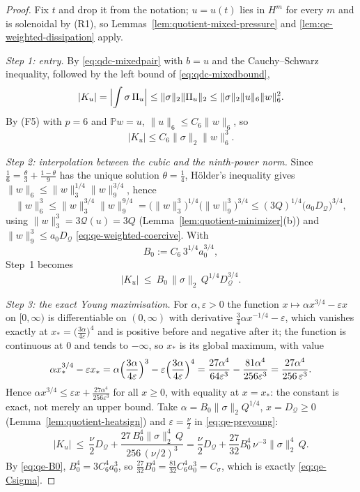 \documentclass[11pt]{article}
\theoremstyle{definition}
\theoremstyle{plain}
\newcommand{\norm}[1]{\lVert #1\rVert}
\begin{document}
\begin{proof}
Fix $t$ and drop it from the notation; $u=u(t)$ lies in $H^m$ for every
$m$ and is solenoidal by (R1), so
Lemmas~\ref{lem:quotient-mixed-pressure} and
\ref{lem:qe-weighted-dissipation} apply.

\emph{Step 1: entry.}  By \eqref{eq:qdc-mixedpair} with $b=u$ and the
Cauchy--Schwarz inequality, followed by the left bound of
\eqref{eq:qdc-mixedbound},
\[
 |K_u|=\Bigl|\int\sigma\,\Pi_u\Bigr|
 \le\norm\sigma_2\norm{\Pi_u}_2
 \le\norm\sigma_2\norm u_6\norm w_6^2 .
\]
By \textup{(F5)} with $p=6$ and $\mathbb Pw=u$,
$\norm u_6\le C_6\norm w_6$, so
\begin{equation}\label{eq:qe-entry}
 |K_u|\le C_6\norm\sigma_2\norm w_6^3 .
\end{equation}

\emph{Step 2: interpolation between the cubic and the ninth-power norm.}
Since $\frac16=\frac{\theta}3+\frac{1-\theta}9$ has the unique solution
$\theta=\frac14$, H\"older's inequality gives
$\norm w_6\le\norm w_3^{1/4}\norm w_9^{3/4}$, hence
\[
 \norm w_6^3\le\norm w_3^{3/4}\norm w_9^{9/4}
 =\bigl(\norm w_3^3\bigr)^{1/4}\bigl(\norm w_9^3\bigr)^{3/4}
 \le(3Q)^{1/4}\bigl(a_0D_{\mathcal Q}\bigr)^{3/4},
\]
using $\norm w_3^3=3\mathcal Q(u)=3Q$ (Lemma~\ref{lem:quotient-minimizer}(b))
and $\norm w_9^3\le a_0D_{\mathcal Q}$
\eqref{eq:qe-weighted-coercive}.  With
\begin{equation}\label{eq:qe-B0}
 B_0:=C_6\,3^{1/4}a_0^{3/4},
\end{equation}
Step~1 becomes
\begin{equation}\label{eq:qe-preyoung}
 |K_u|\ \le\ B_0\,\norm\sigma_2\,Q^{1/4}D_{\mathcal Q}^{3/4}.
\end{equation}

\emph{Step 3: the exact Young maximisation.}  For $\alpha,\varepsilon>0$
the function $x\mapsto\alpha x^{3/4}-\varepsilon x$ on $[0,\infty)$ is
differentiable on $(0,\infty)$ with derivative
$\frac34\alpha x^{-1/4}-\varepsilon$, which vanishes exactly at
$x_*=\bigl(\frac{3\alpha}{4\varepsilon}\bigr)^4$ and is positive before and
negative after it; the function is continuous at $0$ and tends to $-\infty$,
so $x_*$ is its global maximum, with value
\[
 \alpha x_*^{3/4}-\varepsilon x_*
 =\alpha\Bigl(\frac{3\alpha}{4\varepsilon}\Bigr)^3
 -\varepsilon\Bigl(\frac{3\alpha}{4\varepsilon}\Bigr)^4
 =\frac{27\alpha^4}{64\varepsilon^3}-\frac{81\alpha^4}{256\varepsilon^3}
 =\frac{27\alpha^4}{256\,\varepsilon^3}.
\]
Hence $\alpha x^{3/4}\le\varepsilon x+\frac{27\alpha^4}{256\varepsilon^3}$
for all $x\ge0$, with equality at $x=x_*$: the constant is exact, not
merely an upper bound.  Take $\alpha=B_0\norm\sigma_2Q^{1/4}$,
$x=D_{\mathcal Q}\ge0$ (Lemma~\ref{lem:quotient-heatsign}) and
$\varepsilon=\frac\nu2$ in \eqref{eq:qe-preyoung}:
\[
 |K_u|\ \le\ \frac\nu2D_{\mathcal Q}
 +\frac{27\,B_0^4\norm\sigma_2^4\,Q}{256\,(\nu/2)^3}
 =\frac\nu2D_{\mathcal Q}+\frac{27}{32}B_0^4\,\nu^{-3}\norm\sigma_2^4\,Q .
\]
By \eqref{eq:qe-B0}, $B_0^4=3C_6^4a_0^3$, so
$\frac{27}{32}B_0^4=\frac{81}{32}C_6^4a_0^3=C_\sigma$, which is exactly
\eqref{eq:qe-Csigma}.


\end{proof}
\end{document}
